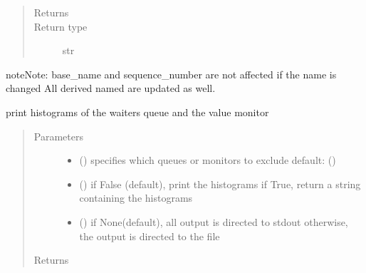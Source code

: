 \documentclass[letterpaper,10pt,english]{sphinxmanual}
\begin{document}
\begin{fulllineitems}
\begin{fulllineitems}
\begin{quote}
\begin{description}
\item[{Returns}] \leavevmode
{}

\item[{Return type}] \leavevmode
str

\end{description}\end{quote}

\begin{sphinxadmonition}{note}{Note:}
base\_name and sequence\_number are not affected if the name is changed 
All derived named are updated as well.
\end{sphinxadmonition}

\end{fulllineitems}


\begin{fulllineitems}
\label{\detokenize{Reference:salabim.State.print_histograms}}
print histograms of the waiters queue and the value monitor
\begin{quote}\begin{description}
\item[{Parameters}] \leavevmode\begin{itemize}
\item {} 
 () \textendash{} specifies which queues or monitors to exclude 
default: ()

\item {} 
 () \textendash{} if False (default), print the histograms
if True, return a string containing the histograms

\item {} 
 () \textendash{} if None(default), all output is directed to stdout 
otherwise, the output is directed to the file

\end{itemize}

\item[{Returns}] \leavevmode
{}


\end{description}
\end{quote}
\end{fulllineitems}
\end{fulllineitems}
\end{document}
